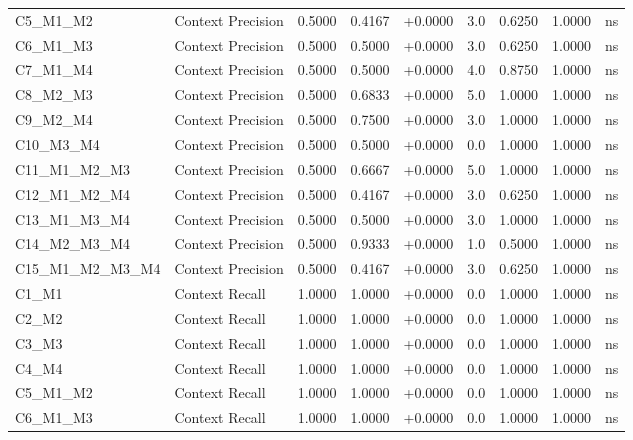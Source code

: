\begin{table}[p]
\begin{tabular*}{\textwidth}{@{\extracolsep{\fill}} l l r r r r r r c @{}}
\addlinespace
C5\_M1\_M2      & Context Precision    & 0.5000 & 0.4167 & +0.0000 & 3.0 & 0.6250 & 1.0000 & ns \\
\addlinespace
C6\_M1\_M3      & Context Precision    & 0.5000 & 0.5000 & +0.0000 & 3.0 & 0.6250 & 1.0000 & ns \\
\addlinespace
C7\_M1\_M4      & Context Precision    & 0.5000 & 0.5000 & +0.0000 & 4.0 & 0.8750 & 1.0000 & ns \\
\addlinespace
C8\_M2\_M3      & Context Precision    & 0.5000 & 0.6833 & +0.0000 & 5.0 & 1.0000 & 1.0000 & ns \\
\addlinespace
C9\_M2\_M4      & Context Precision    & 0.5000 & 0.7500 & +0.0000 & 3.0 & 1.0000 & 1.0000 & ns \\
\addlinespace
C10\_M3\_M4     & Context Precision    & 0.5000 & 0.5000 & +0.0000 & 0.0 & 1.0000 & 1.0000 & ns \\
\addlinespace
C11\_M1\_M2\_M3 & Context Precision    & 0.5000 & 0.6667 & +0.0000 & 5.0 & 1.0000 & 1.0000 & ns \\
\addlinespace
C12\_M1\_M2\_M4 & Context Precision    & 0.5000 & 0.4167 & +0.0000 & 3.0 & 0.6250 & 1.0000 & ns \\
\addlinespace
C13\_M1\_M3\_M4 & Context Precision    & 0.5000 & 0.5000 & +0.0000 & 3.0 & 1.0000 & 1.0000 & ns \\
\addlinespace
C14\_M2\_M3\_M4 & Context Precision    & 0.5000 & 0.9333 & +0.0000 & 1.0 & 0.5000 & 1.0000 & ns \\
\addlinespace
C15\_M1\_M2\_M3\_M4 & Context Precision    & 0.5000 & 0.4167 & +0.0000 & 3.0 & 0.6250 & 1.0000 & ns \\
\addlinespace
C1\_M1          & Context Recall       & 1.0000 & 1.0000 & +0.0000 & 0.0 & 1.0000 & 1.0000 & ns \\
\addlinespace
C2\_M2          & Context Recall       & 1.0000 & 1.0000 & +0.0000 & 0.0 & 1.0000 & 1.0000 & ns \\
\addlinespace
C3\_M3          & Context Recall       & 1.0000 & 1.0000 & +0.0000 & 0.0 & 1.0000 & 1.0000 & ns \\
\addlinespace
C4\_M4          & Context Recall       & 1.0000 & 1.0000 & +0.0000 & 0.0 & 1.0000 & 1.0000 & ns \\
\addlinespace
C5\_M1\_M2      & Context Recall       & 1.0000 & 1.0000 & +0.0000 & 0.0 & 1.0000 & 1.0000 & ns \\
\addlinespace
C6\_M1\_M3      & Context Recall       & 1.0000 & 1.0000 & +0.0000 & 0.0 & 1.0000 & 1.0000 & ns \\

\end{tabular*}
\end{table}
